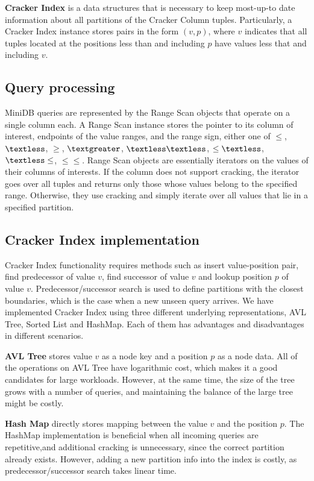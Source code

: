 \textbf{Cracker Index} is a data structures that is necessary to keep most-up-to date information about all partitions of the Cracker Column tuples. Particularly, a Cracker Index instance stores pairs in the form $(v, p)$, where $v$ indicates that all tuples located at the positions less than and including $p$ have values less that and including $v$.

\subsection{Query processing}
MiniDB queries are represented by the Range Scan objects that operate on a single column each. A Range Scan instance stores the pointer to its column of interest, endpoints of the value ranges, and the range sign, either one of $\leq$, $\textless$, $\geq$, $\textgreater$, $\textless \textless$, $\leq \textless$, $\textless \leq$, $\leq \leq$. Range Scan objects are essentially iterators on the values of their columns of interests. If the column does not support cracking, the iterator goes over all tuples and returns only those whose values belong to the specified range. Otherwise, they use cracking and simply iterate over all values that lie in a specified partition. 


\subsection{Cracker Index implementation}
Cracker Index functionality requires methods such as insert value-position pair, find predecessor of value $v$, find successor of value $v$ and lookup position $p$ of value $v$. Predecessor/successor search is used to define partitions with the closest boundaries, which is the case when a new unseen query arrives. We have implemented Cracker Index using three different underlying representations, AVL Tree, Sorted List and HashMap. Each of them has advantages and disadvantages in different scenarios.

\textbf{AVL Tree} stores value $v$ as a node key and a position $p$ as a node data. All of the operations on AVL Tree have logarithmic cost, which makes it a good candidates for large workloads. However, at the same time, the size of the tree grows with a number of queries, and maintaining the balance of the large tree might be costly.

\textbf{Hash Map} directly stores mapping between the value $v$ and the position $p$. The HashMap implementation is beneficial when all incoming queries are repetitive,and additional cracking is unnecessary, since the correct partition already exists. However, adding a new partition info into the index is costly, as predecessor/successor search takes linear time.

